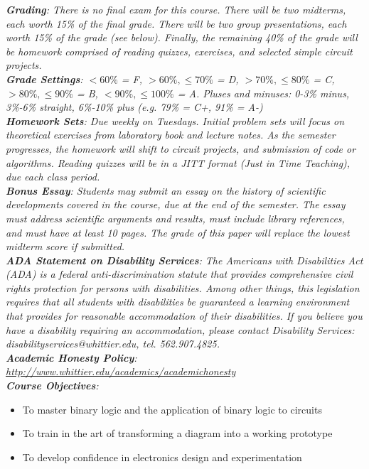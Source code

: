 \documentclass[10pt]{article}
\begin{document}
\textit{\textbf{Grading}: There is no final exam for this course.  There will be two midterms, each worth 15\% of the final grade.  There will be two group presentations, each worth 15\% of the grade (see below).  Finally, the remaining 40\% of the grade will be homework comprised of reading quizzes, exercises, and selected simple circuit projects.} \\
\textit{\textbf{Grade Settings}: $<60\%$ = F, $>60\%,\leq 70\%$ = D, $>70\%,\leq80\%$ = C, $>80\%,\leq 90\%$ = B, $<90\%,\leq 100\%$ = A.  Pluses and minuses: 0-3\% minus, 3\%-6\% straight, 6\%-10\% plus (e.g. 79\% = C+, 91\% = A-)} \\
\textit{\textbf{Homework Sets}: Due weekly on Tuesdays.  Initial problem sets will focus on theoretical exercises from laboratory book and lecture notes.  As the semester progresses, the homework will shift to circuit projects, and submission of code or algorithms.  Reading quizzes will be in a JITT format (Just in Time Teaching), due each class period.} \\
\textit{\textbf{Bonus Essay}: Students may submit an essay on the history of scientific developments covered in the course, due at the end of the semester.  The essay must address scientific arguments and results, must include library references, and must have at least 10 pages.  The grade of this paper will replace the lowest midterm score if submitted.} \\
\textit{\textbf{ADA Statement on Disability Services}: The Americans with Disabilities Act (ADA) is a federal anti-discrimination statute that provides comprehensive civil rights protection for persons with disabilities. Among other things, this legislation requires that all students with disabilities be guaranteed a learning environment that provides for reasonable accommodation of their disabilities. If you believe you have a disability requiring an accommodation, please contact Disability Services: disabilityservices@whittier.edu, tel. 562.907.4825.} \\
\textit{\textbf{Academic Honesty Policy}: \url{http://www.whittier.edu/academics/academichonesty}} \\
\textit{\textbf{Course Objectives}:}
\begin{itemize}
\item To master binary logic and the application of binary logic to circuits
\item To train in the art of transforming a diagram into a working prototype
\item To develop confidence in electronics design and experimentation
\end{itemize}
\end{document}
